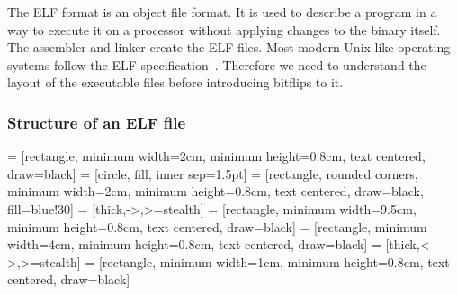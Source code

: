 The ELF format is an object file format. It is used to describe a program in a
way to execute it on a processor without applying changes to the binary itself.
The assembler and linker create the ELF files. Most modern Unix-like operating
systems follow the ELF specification~\cite{elfspec}. Therefore we need to
understand the layout of the executable files before introducing bitflips to it.


\subsubsection{Structure of an ELF file}

 = [rectangle, minimum width=2cm, minimum height=0.8cm,
text centered, draw=black]
 = [circle, fill, inner sep=1.5pt]
 = [rectangle, rounded corners, minimum width=2cm,
minimum height=0.8cm, text centered, draw=black, fill=blue!30]
 = [thick,->,>=stealth]
 = [rectangle, minimum width=9.5cm, minimum
height=0.8cm, text centered, draw=black]
 = [rectangle, minimum width=4cm, minimum
height=0.8cm, text centered, draw=black]
 = [thick,<->,>=stealth]
 = [rectangle, minimum width=1cm, minimum height=0.8cm,
text centered, draw=black]

